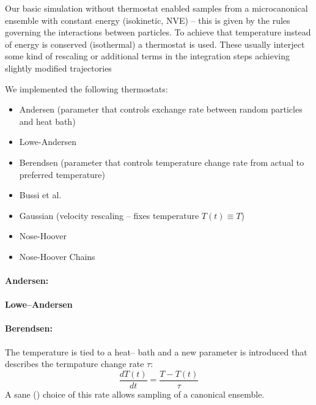 

Our basic simulation without thermostat enabled samples from a microcanonical ensemble with constant energy (isokinetic, NVE) -- this is given by the rules governing the interactions between particles.
To achieve that temperature instead of energy is conserved (isothermal) a thermostat is used. These usually interject some kind of rescaling or additional terms in the integration steps achieving slightly modified trajectories

We implemented the following thermostats: %
\begin{itemize}
\item Andersen (parameter that controls exchange rate between random particles and heat bath)
\item Lowe-Andersen
\item Berendsen (parameter that controls temperature change rate from actual to preferred temperature)
\item Bussi et al.
\item Gaussian (velocity rescaling -- fixes temperature $T(t) \equiv T$)
\item Nose-Hoover
\item Nose-Hoover Chains
\end{itemize}

\paragraph{Andersen:}
\paragraph{Lowe--Andersen}
\paragraph{Berendsen:}The temperature is tied to a heat-- bath and a new parameter is introduced that describes the termpature change rate $\tau$:
\begin{equation*}
\frac{dT(t)}{dt} = \frac{T-T(t)}{\tau} %
\end{equation*}
A sane (\TODO) choice of this rate allows sampling of a canonical ensemble.

